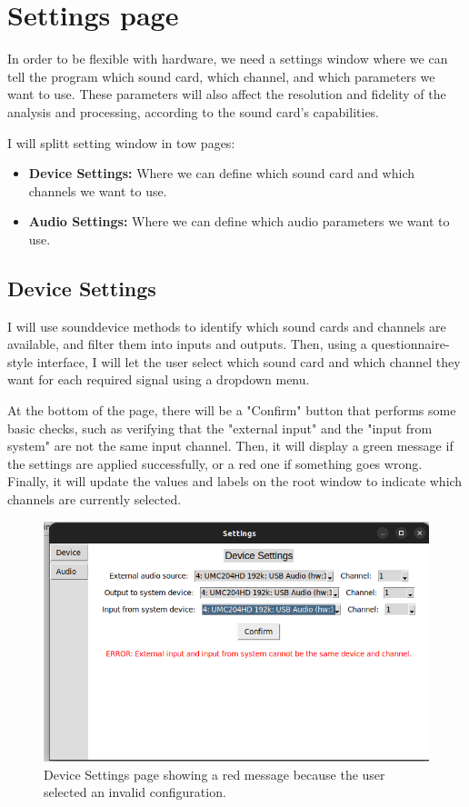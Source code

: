 \section{Settings page}

In order to be flexible with hardware, we need a settings window where we can tell the program which sound card, which channel, and which parameters we want to use. These parameters will also affect the resolution and fidelity of the analysis and processing, according to the sound card’s capabilities.

I will splitt setting window in tow pages:
\begin{itemize}
	\item \textbf{Device Settings:} Where we can define which sound card and which channels we want to use.
	\item \textbf{Audio Settings:} Where we can define which audio parameters we want to use.
\end{itemize}

\subsection{Device Settings}

I will use sounddevice methods to identify which sound cards and channels are available, and filter them into inputs and outputs. Then, using a questionnaire-style interface, I will let the user select which sound card and which channel they want for each required signal using a dropdown menu.

At the bottom of the page, there will be a "Confirm" button that performs some basic checks, such as verifying that the "external input" and the "input from system" are not the same input channel. Then, it will display a green message if the settings are applied successfully, or a red one if something goes wrong. Finally, it will update the values and labels on the root window to indicate which channels are currently selected.

\begin{figure}[H]
	\centering
	\includegraphics[width=0.8
	\linewidth]{Figures/DevSet.png}
	\caption{Device Settings page showing a red message because the user selected an invalid configuration.}
	\label{fig:Device Settings}
\end{figure}

